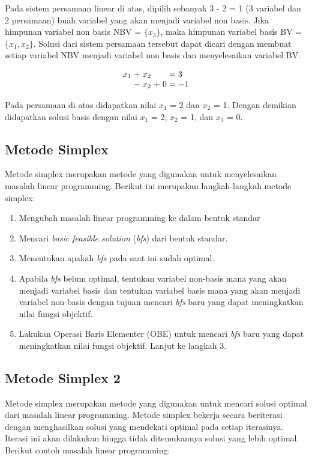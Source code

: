 Pada sistem persamaan linear di atas, dipilih sebanyak 3 - 2 = 1 (3 variabel dan 2 persamaan) buah variabel yang akan menjadi variabel non basis. Jika himpunan variabel non basis NBV = \(\{x_3\}\), maka himpunan variabel basis BV = \(\{x_1, x_2\}\). Solusi dari sistem persamaan tersebut dapat dicari dengan membuat setiap variabel NBV menjadi variabel non basis dan menyelesaikan variabel BV.

\begin{equation*}
	\setlength\arraycolsep{1.5pt}
	\begin{array}{r c r c r c l}
		x_1 &+ &x_2 &  &    &= &3\\
		    &- &x_2 &+ &0 &= &-1
	\end{array}
\end{equation*}

Pada persamaan di atas didapatkan nilai \(x_1\) = 2 dan \(x_2\) = 1. Dengan demikian didapatkan solusi basis dengan nilai \(x_1\) = 2, \(x_2\) = 1, dan \(x_3\) = 0.

\subsection{Metode Simplex}
Metode simplex merupakan metode yang digunakan untuk menyelesaikan masalah linear programming. Berikut ini merupakan langkah-langkah metode simplex:
\begin{enumerate}
	\item Mengubah masalah linear programming ke dalam bentuk standar
	\item Mencari \textit{basic feasible solution} (\textit{bfs}) dari bentuk standar.
	\item Menentukan apakah \textit{bfs} pada saat ini sudah optimal.
	\item Apabila \textit{bfs} belum optimal, tentukan variabel non-basis mana yang akan menjadi variabel basis dan tentukan variabel basis mana yang akan menjadi variabel non-basis dengan tujuan mencari \textit{bfs} baru yang dapat meningkatkan nilai fungsi objektif.
	\item Lakukan Operasi Baris Elementer (OBE) untuk mencari \textit{bfs} baru yang dapat meningkatkan nilai fungsi objektif. Lanjut ke langkah 3.
\end{enumerate}

\subsection{Metode Simplex 2}

Metode simplex merupakan metode yang digunakan untuk mencari solusi optimal dari masalah linear programming. Metode simplex bekerja secara beriterasi dengan menghasilkan solusi yang mendekati optimal pada setiap iterasinya. Iterasi ini akan dilakukan hingga tidak ditemukannya solusi yang lebih optimal. Berikut contoh masalah linear programming:

